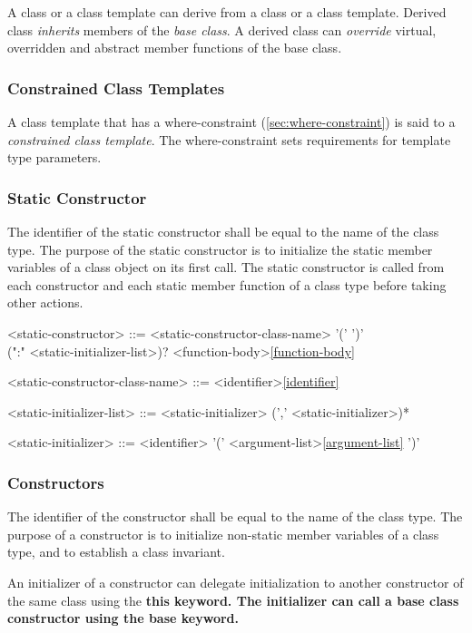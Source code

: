 \documentclass[a4paper,oneside,11pt]{article}
\begin{document}
A class or a class template can derive from a class or a class template.
Derived class \emph{inherits} members of the \emph{base class}.
A derived class can \emph{override} virtual, overridden and abstract member functions of the base class.

\subsubsection{Constrained Class Templates}

A class template that has a where-constraint (\ref{sec:where-constraint}) is said to a \emph{constrained class template}.
The where-constraint sets requirements for template type parameters.

\subsubsection{Static Constructor}

The identifier of the static constructor shall be equal to the name of the class type.
The purpose of the static constructor is to initialize the static member variables of a class object on its first call.
The static constructor is called from each constructor and each static member function of a class type
before taking other actions.

\begin{grammar}
\label{static-constructor}<static-constructor> ::=  <static-constructor-class-name> '(' ')'\\
(":" <static-initializer-list>)? <function-body>\ref{function-body}

<static-constructor-class-name> ::= <identifier>\ref{identifier}

<static-initializer-list> ::= <static-initializer> (',' <static-initializer>)*

<static-initializer> ::= <identifier> '(' <argument-list>\ref{argument-list} ')'
\end{grammar}

\subsubsection{Constructors}

The identifier of the constructor shall be equal to the name of the class type.
The purpose of a constructor is to initialize non-static member variables of a class type,
and to establish a class invariant.

An initializer of a constructor can delegate initialization to another constructor of
the same class using the \bf{this} keyword.
The initializer can call a base class constructor using the \bf{base} keyword.
\end{document}
